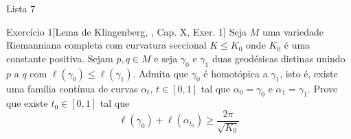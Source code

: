 \vspace{10pt}
{\huge Lista 7}
\begin{thing6}{Exercício 1}[Lema de Klingenberg, \cite{doc}, Cap. X, Exer. 1]\label{exer:1}\leavevmode
	Seja \(M\) uma variedade Riemanniana completa com curvatura seccional \(K \leq  K_0\) onde \(K_0\) é uma constante positiva. Sejam \(p,q \in M\) e seja \(\gamma_0\) e \(\gamma_1\) duas geodésicas distinas unindo \(p\) a \(q\) com  \(\ell(\gamma_0) \leq  \ell(\gamma_1)\). Admita que \(\gamma_0\) é homotópica a \(\gamma_1\), isto é, existe uma família contínua de curvas \(\alpha_t\), \(t \in [0,1]\) tal que \(\alpha_0 = \gamma_0\) e \(\alpha_1=\gamma_1\). Prove que existe \(t_0 \in [0,1]\) tal que
	\[\ell(\gamma_0)+\ell(\alpha_{t_0}) \geq  \frac{2\pi}{\sqrt{K_0} }\]
\end{thing6}

